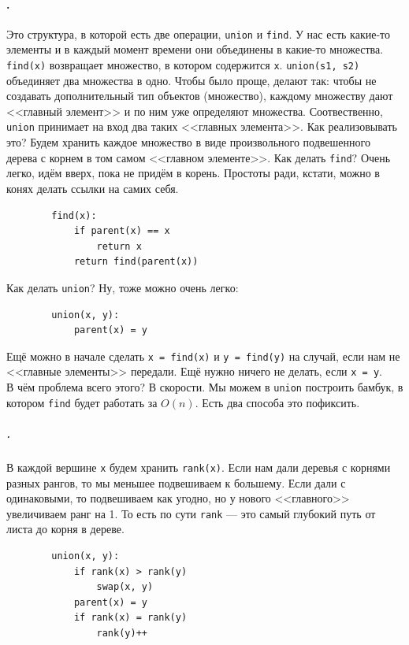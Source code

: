 \documentclass{article}
\newcommand{\pseudo}{PseudoLexer.py:PseudoLexer -x}
\newcommand{\pseudocode}[1]{\texttt{#1}}
\begin{document}
    \paragraph{.}
    Это структура, в которой есть две операции, \pseudocode{union} и \pseudocode{find}. У нас есть какие-то элементы и в каждый момент времени они объединены в какие-то множества. \pseudocode{find(x)} возвращает множество, в котором содержится \pseudocode{x}. \pseudocode{union(s1, s2)} объединяет два множества в одно. Чтобы было проще, делают так: чтобы не создавать дополнительный тип объектов (множество), каждому множеству дают <<главный элемент>> и по ним уже определяют множества. Соотвественно, \pseudocode{union} принимает на вход два таких <<главных элемента>>. Как реализовывать это? Будем хранить каждое множество в виде произвольного подвешенного дерева с корнем в том самом <<главном элементе>>. Как делать \pseudocode{find}? Очень легко, идём вверх, пока не придём в корень. Простоты ради, кстати, можно в конях делать ссылки на самих себя.
    \begin{verbatim}
        find(x):
            if parent(x) == x
                return x
            return find(parent(x))
    \end{verbatim}
    Как делать \pseudocode{union}? Ну, тоже можно очень легко:
    \begin{verbatim}
        union(x, y):
            parent(x) = y
    \end{verbatim}
    Ещё можно в начале сделать \pseudocode{x = find(x)} и \pseudocode{y = find(y)} на случай, если нам не <<главные элементы>> передали. Ещё нужно ничего не делать, если \pseudocode{x = y}.\\
    В чём проблема всего этого? В скорости. Мы можем в \pseudocode{union} построить бамбук, в котором \pseudocode{find} будет работать за $O(n)$. Есть два способа это пофиксить.
    \subparagraph{.}
    В каждой вершине \pseudocode{x} будем хранить \pseudocode{rank(x)}. Если нам дали деревья с корнями разных рангов, то мы меньшее подвешиваем к большему. Если дали с одинаковыми, то подвешиваем как угодно, но у нового <<главного>> увеличиваем ранг на 1. То есть по сути \pseudocode{rank} --- это самый глубокий путь от листа до корня в дереве.
    \begin{verbatim}
        union(x, y):
            if rank(x) > rank(y)
                swap(x, y)
            parent(x) = y
            if rank(x) = rank(y)
                rank(y)++
    \end{verbatim}
\end{document}
